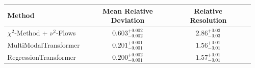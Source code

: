     \begin{tabular}{lccc}
        \toprule
        Method & Mean Relative Deviation & Relative Resolution \\
        \midrule
        $\chi^2$-Method + $\nu^2$-Flows & $0.603_{-0.002}^{+0.002}$ & $2.86_{-0.03}^{+0.03}$ \\
        MultiModalTransformer & $0.201_{-0.001}^{+0.001}$ & $1.56_{-0.01}^{+0.01}$ \\
        RegressionTransformer & $0.200_{-0.001}^{+0.002}$ & $1.57_{-0.01}^{+0.01}$ \\
        \bottomrule
    \end{tabular}